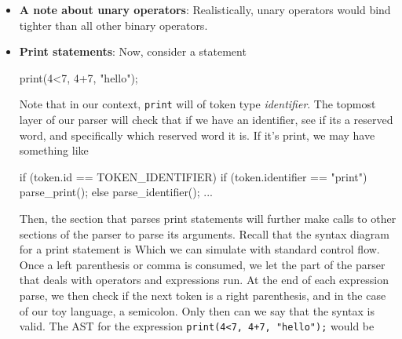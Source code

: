 \documentclass{report}
\begin{document}
\begin{itemize}
            \begin{align*}
                a + b < c + d
            .\end{align*}
            Our parser will descend down to the arithmetic section and parse $a+b$. At this point the next token is relation, so we float back up to the relational section to consume the relational operator $<$. Then, the parser descends back down to the arithmetic section to parse $c+d$. 
            \bigbreak \noindent 
            At the end, we will have
            \bigbreak \noindent 
            \bigbreak \noindent 
            This layered structure is precisely how we maintain precedence between operator classes.
        \item \textbf{A note about unary operators}: Realistically, unary operators would bind tighter than all other binary operators.
    \item \textbf{Print statements}: Now, consider a statement
        \bigbreak \noindent 
        \begin{cppcode}
        print(4<7, 4+7, "hello");
        \end{cppcode}
        \bigbreak \noindent 
        Note that in our context, \texttt{print} will of token type \textit{identifier}. The topmost layer of our parser will check that if we have an identifier, see if its a reserved word, and specifically which reserved word it is. If it's print, we may have something like
        \bigbreak \noindent 
        \begin{cppcode}
            if (token.id == TOKEN_IDENTIFIER) {
                if (token.identifier == "print") parse_print();
                else parse_identifier();
            } 
            ...
        \end{cppcode}
        \bigbreak \noindent 
        Then, the section that parses print statements will further make calls to other sections of the parser to parse its arguments. Recall that the syntax diagram for a print statement is
        \bigbreak \noindent 
        \bigbreak \noindent 
        Which we can simulate with standard control flow. Once a left parenthesis or comma is consumed, we let the part of the parser that deals with operators and expressions run. At the end of each expression parse, we then check if the next token is a right parenthesis, and in the case of our toy language, a semicolon. Only then can we say that the syntax is valid. 
        \bigbreak \noindent 
        The AST for the expression \texttt{print(4<7, 4+7, "hello");} would be

\end{itemize}
\end{document}
